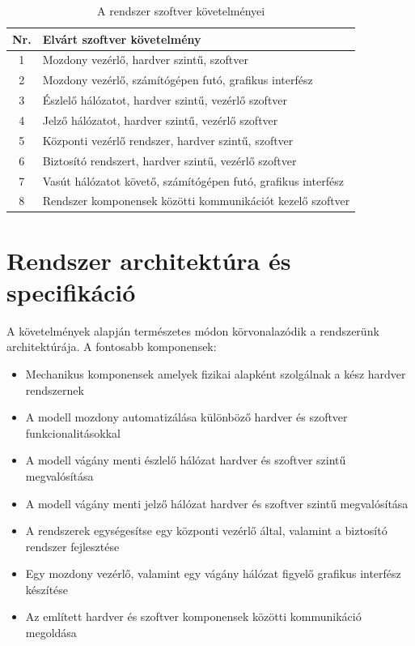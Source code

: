 \documentclass[a4paper,12pt]{article}
\begin{document}
\begin{table}[!htbp]
    \centering
    \begin{tabular}{|c|m{12cm}|} \hline
        Nr. & Elvárt szoftver követelmény\\ \hline
        1 & Mozdony vezérlő, hardver szintű, szoftver \\ \hline
        2 & Mozdony vezérlő, számítógépen futó, grafikus interfész \\ \hline
        3 & Észlelő hálózatot, hardver szintű, vezérlő szoftver \\ \hline
		4 & Jelző hálózatot, hardver szintű, vezérlő szoftver \\ \hline
		5 & Központi vezérlő rendszer, hardver szintű, szoftver \\ \hline
		6 & Biztosító rendszert, hardver szintű, vezérlő szoftver  \\ \hline
		7 & Vasút hálózatot követő, számítógépen futó, grafikus interfész \\ \hline
		8 & Rendszer komponensek közötti kommunikációt kezelő szoftver \\ \hline
    \end{tabular}
    \caption[Szoftver követelmény]{A rendszer szoftver követelményei}
    \label{tab:softrequirment}
\end{table}

\newpage
\section{Rendszer architektúra és specifikáció}
A követelmények alapján természetes módon körvonalazódik a rendszerünk architektúrája.
A fontosabb komponensek:
\begin{itemize}
	\item Mechanikus komponensek amelyek fizikai alapként szolgálnak a kész hardver rendszernek
	\item A modell mozdony automatizálása különböző hardver és szoftver funkcionalitásokkal
	\item A modell vágány menti észlelő hálózat hardver és szoftver szintű megvalósítása
	\item A modell vágány menti jelző hálózat hardver és szoftver szintű megvalósítása
	\item A rendszerek egységesítse egy központi vezérlő által, valamint a biztosító rendszer fejlesztése
	\item Egy mozdony vezérlő, valamint egy vágány hálózat figyelő grafikus interfész készítése
	\item Az említett hardver és szoftver komponensek közötti kommunikáció megoldása
\end{itemize}
\end{document}

